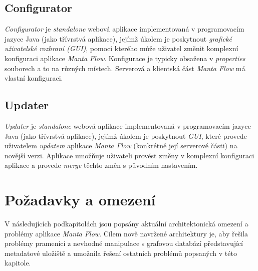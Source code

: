 \subsection{Configurator}
\label{sec:ana_configurator}
\textit{Configurator} je \textit{standalone} webová aplikace implementovaná v programovacím jazyce Java (jako třívrstvá aplikace), jejímž úkolem je poskytnout \textit{grafické uživatelské rozhraní (GUI)}, pomocí kterého může uživatel změnit komplexní konfiguraci aplikace \textit{Manta Flow}. Konfigurace je typicky obsažena v \textit{properties} souborech a to na různých místech. Serverová a klientská část \textit{Manta Flow} má vlastní konfiguraci. \cite{Molitor18}

\subsection{Updater}
\label{sec:ana_updater}
\textit{Updater} je \textit{standalone} webová aplikace implementovaná v programovacím jazyce Java (jako třívrstvá aplikace), jejímž úkolem je poskytnout \textit{GUI}, které provede uživatelem \textit{updatem} aplikace \textit{Manta Flow} (konkrétně její serverové části) na novější verzi. Aplikace umožňuje uživateli provést změny v komplexní konfiguraci aplikace a provede \textit{merge} těchto změn s původním nastavením. \cite{Gondek16}

\section{Požadavky a omezení}
\label{sec:ana_problems}
V následujících podkapitolách jsou popsány aktuální architektonická omezení a problémy aplikace \textit{Manta Flow}. Cílem nově navržené architektury je, aby řešila problémy pramenící z nevhodné manipulace s grafovou databází představující metadatové uložiště a umožnila řešení ostatních problémů popsaných v této kapitole.


